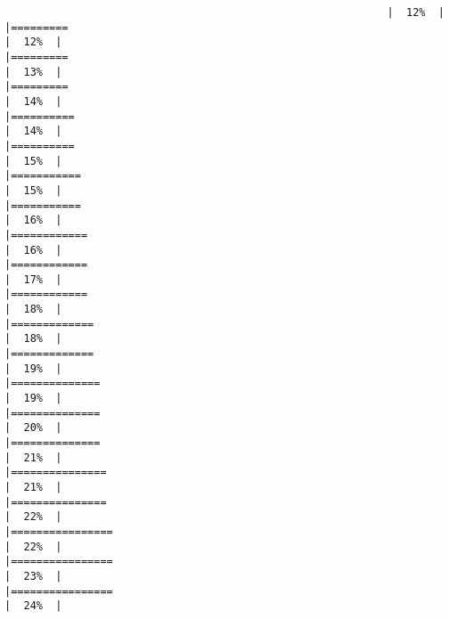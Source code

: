 \documentclass[
]{article}
\begin{document}
\begin{verbatim}
                                                            |  12%  |                                                                              |=========                                                             |  12%  |                                                                              |=========                                                             |  13%  |                                                                              |=========                                                             |  14%  |                                                                              |==========                                                            |  14%  |                                                                              |==========                                                            |  15%  |                                                                              |===========                                                           |  15%  |                                                                              |===========                                                           |  16%  |                                                                              |============                                                          |  16%  |                                                                              |============                                                          |  17%  |                                                                              |============                                                          |  18%  |                                                                              |=============                                                         |  18%  |                                                                              |=============                                                         |  19%  |                                                                              |==============                                                        |  19%  |                                                                              |==============                                                        |  20%  |                                                                              |==============                                                        |  21%  |                                                                              |===============                                                       |  21%  |                                                                              |===============                                                       |  22%  |                                                                              |================                                                      |  22%  |                                                                              |================                                                      |  23%  |                                                                              |================                                                      |  24%  |                                                                              
\end{verbatim}
\end{document}
